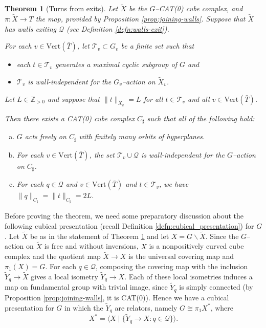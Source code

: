 \documentclass[11pt,oneside]{amsart}
\newcounter{ax}
\newtheorem{thm}{Theorem}[section]
\theoremstyle{definition}
\newcommand{\field}[1]{\mathbb{#1}}
\newcommand{\integers}{\ensuremath{\field{Z}}}
\newcommand{\vertices}{\mathrm{Vert}}
\begin{document}
\begin{thm}[Turns from exits]\label{thm:cubulation-with-turns}
Let $\widetilde X$ be the $G$--CAT(0) cube complex, and $\pi:\widetilde X\to T$ the map, provided by Proposition \ref{prop:joining-walls}.  Suppose that  $\widetilde X$ has walls exiting $\mathcal Q$ (see Definition \ref{defn:walls-exit}).

For each $v\in\vertices(\bar T)$, let $\mathcal T_v\subset G_v$ be a finite set such that 
\begin{itemize}
 \item each $t\in\mathcal T_v$ generates a maximal cyclic subgroup of $G$ and
 \item $\mathcal T_v$ is wall-independent for the $G_v$--action on $\widetilde X_v$.
\end{itemize}


 Let $L\in\integers_{>0}$ and suppose that $\|t\|_{\widetilde X_v}=L$ for all $t\in\mathcal T_v$ and all $v\in\vertices(\bar T)$.  

Then there exists a CAT(0) cube complex $C_\sharp$ such that all of the following hold:
\begin{enumerate}[(a)]
 \item \label{item:turns-action} $G$ acts freely on $C_\sharp$ with finitely many orbits of hyperplanes.
 \item \label{item:turns-wall-independent} For each $v\in\vertices(\bar T)$, the set $\mathcal T_v\cup\mathcal Q$ is wall-independent for the $G$--action on $C_\sharp$.
 \item \label{item:turns-equal} For each $q\in\mathcal Q$ and $v\in\vertices(\bar T)$ and $t\in\mathcal T_v$, we have $\|q\|_{C_\sharp}=\|t\|_{C_\sharp}=2 L$.
\end{enumerate}
\end{thm}

Before proving the theorem, we need some preparatory discussion about the following cubical presentation (recall Definition \ref{defn:cubical_presentation}) for $G$.  Let $\widetilde X$ be as in the statement of Theorem \ref{thm:cubulation-with-turns} and let $X=G\backslash \widetilde X$.  Since the $G$--action on $\widetilde X$ is free and without inversions, $X$ is a nonpositively curved cube complex and the quotient map $\widetilde X\to X$ is the universal covering map and $\pi_1(X)=G$.  For each $q\in\mathcal Q$, composing the covering map with the inclusion $\widetilde Y_q\to\widetilde X$ gives a local isometry $\widetilde Y_q\to X$.  Each of these local isometries induces a map on fundamental group with trivial image, since $\widetilde Y_q$ is simply connected (by Proposition \ref{prop:joining-walls}, it is CAT(0)).  Hence we have a cubical presentation for $G$ in which the $\widetilde Y_q$ are relators, namely $G\cong \pi_1X^*$, where 
$$X^*=\langle X\mid \{\widetilde Y_q\to X:q\in\mathcal Q\}\rangle.$$
\end{document}
